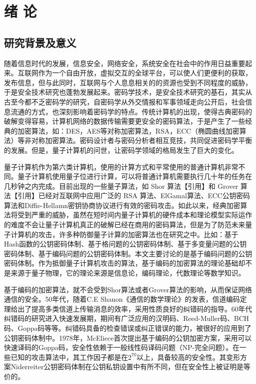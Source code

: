 \chapter{绪\hskip 0.4cm 论}
\label{chap1}

\section{研究背景及意义}
随着信息时代的发展，信息安全，网络安全，系统安全在社会中的作用日益重要起来。互联网作为一个自由开放，虚拟交互的全球平台，可以使人们更便利的获取，发布信息，但与此同时，互联网与个人息息相关的的资源也受到不同程度的威胁，于是安全技术研究也蓬勃发展起来。密码学技术，是安全技术研究的基石，其实从古至今都不乏密码学的研究，自密码学从外交情报和军事领域走向公开后，社会信息流通的方式，也深刻影响着密码学的特点。传统计算机的出现，使得古典密码的破解变得容易，计算机网络的数据传输需要更安全的密码算法，于是产生了一些经典的加密算法，如：DES，AES等对称加密算法，RSA，ECC（椭圆曲线加密算法）等非对称加密算法。密码设计者与密码分析者相互竞技，共同促进密码学平衡的发展。但是，量子计算机的问世，让密码学领域的格局发生了巨大的变化。

量子计算机作为第六类计算机，使用的计算方式和平常使用的普通计算机非常不同。量子计算机使用量子位进行计算，可以将普通计算机需要执行几十年的任务在几秒钟之内完成。目前出现的一些量子算法，如 Shor 算法【引用】和 Grover 算法【引用】已经对互联网中应用广泛的 RSA 算法、ElGamal算法、ECC公钥密码算法和Diffie-Hellamn密钥协商协议进行有效的密码攻击。如此以来，经典加密算法将受到严重的威胁，虽然在短时间内量子计算机的硬件成本和理论模型实际运作的难度不会让量子计算机真正的破解已经在商用的密码算法，但是为了防范未来量子计算机的攻击，许多种防御量子计算的加密算法也在研究之中。比如：基于Hash函数的公钥密码体制、基于格问题的公钥密码体制、基于多变量问题的公钥密码体制、基于编码问题的公钥密码体制。本文主要讨论的是基于编码问题的公钥密码体制。作为抵御量子计算机攻击的算法，基于编码的加密算法的理论基础却不是来源于量子物理，它的理论来源是信息论，编码理论，代数理论等数学知识。

基于编码的加密算法，就不会受到Shor算法或者Grover算法的影响，从而保证网络通信的安全。50年代，随着C.E Shanon《通信的数学理论》的发表，信道编码定理给出了提高多类信道上传输消息的效率，采用性质良好的纠错码的指导。60年代纠错码的研究进入快速发展期，期间有广泛应用的汉明码、Reed-Muller码、BCH码、Goppa码等等。纠错码具备的检查错误或纠正错误的能力，被很好的应用到了公钥密码体制中。1978年，McEliece首次提出基于编码的公钥加密方案，采用可以快速译码的Goppa码，安全性依赖于一般线性码译码问题（NP-完全问题）。在一些已知的攻击算法中，其工作因子都是在$2 ^ {70}$以上，具备较高的安全性。其变形方案Niderreiter公钥密码体制在公钥私钥设置中有所不同，但在安全性上被证明是等价的。

